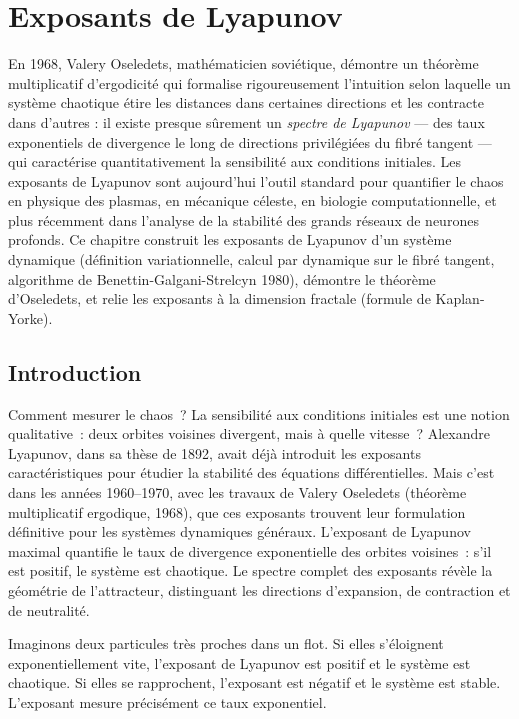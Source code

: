 \chapter{Exposants de Lyapunov}
\label{ch:exposants}

En 1968, Valery Oseledets, mathématicien soviétique, démontre un théorème multiplicatif d'ergodicité qui formalise rigoureusement l'intuition selon laquelle un système chaotique étire les distances dans certaines directions et les contracte dans d'autres : il existe presque sûrement un \emph{spectre de Lyapunov} --- des taux exponentiels de divergence le long de directions privilégiées du fibré tangent --- qui caractérise quantitativement la sensibilité aux conditions initiales. Les exposants de Lyapunov sont aujourd'hui l'outil standard pour quantifier le chaos en physique des plasmas, en mécanique céleste, en biologie computationnelle, et plus récemment dans l'analyse de la stabilité des grands réseaux de neurones profonds. Ce chapitre construit les exposants de Lyapunov d'un système dynamique (définition variationnelle, calcul par dynamique sur le fibré tangent, algorithme de Benettin-Galgani-Strelcyn 1980), démontre le théorème d'Oseledets, et relie les exposants à la dimension fractale (formule de Kaplan-Yorke).

\section{Introduction}

Comment mesurer le chaos~? La sensibilit\'e aux conditions initiales est une notion qualitative~: deux orbites voisines divergent, mais \`a quelle vitesse~? Alexandre Lyapunov, dans sa th\`ese de 1892, avait d\'ej\`a introduit les exposants caract\'eristiques pour \'etudier la stabilit\'e des \'equations diff\'erentielles. Mais c'est dans les ann\'ees 1960--1970, avec les travaux de Valery Oseledets (th\'eor\`eme multiplicatif ergodique, 1968), que ces exposants trouvent leur formulation d\'efinitive pour les syst\`emes dynamiques g\'en\'eraux. L'exposant de Lyapunov maximal quantifie le taux de divergence exponentielle des orbites voisines~: s'il est positif, le syst\`eme est chaotique. Le spectre complet des exposants r\'ev\`ele la g\'eom\'etrie de l'attracteur, distinguant les directions d'expansion, de contraction et de neutralit\'e.

\begin{intuition}
Imaginons deux particules tr\`es proches dans un flot. Si elles s'\'eloignent
exponentiellement vite, l'exposant de Lyapunov est positif et le syst\`eme est
chaotique. Si elles se rapprochent, l'exposant est n\'egatif et le syst\`eme
est stable. L'exposant mesure pr\'ecis\'ement ce taux exponentiel.
\end{intuition}

